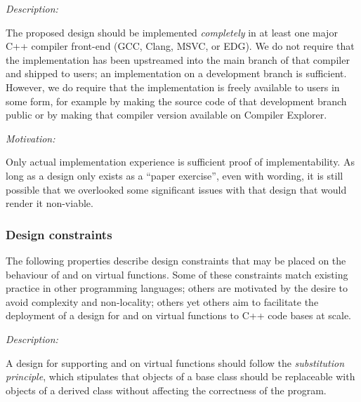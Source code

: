 
\emph{Description:}

The proposed design should be implemented \emph{completely} in at least one major C++ compiler front-end (GCC, Clang, MSVC, or EDG). We do not require that the implementation has been upstreamed into the main branch of that compiler and shipped to users; an implementation on a development branch is sufficient. However, we do require that the implementation is freely available to users in some form, for example by making the source code of that development branch public or by making that compiler version available on Compiler Explorer.

\emph{Motivation:}

Only actual implementation experience is sufficient proof of implementability. As long as a design only exists as a ``paper exercise'', even with wording, it is still possible that we overlooked some significant issues with that design that would render it non-viable.


\subsubsection{Design constraints}

The following properties describe design constraints that may be placed on the behaviour of  and  on virtual functions. Some of these constraints match existing practice in other programming languages; others are motivated by the desire to avoid complexity and non-locality; others yet others aim to facilitate the deployment of a design for  and  on virtual functions to C++ code bases at scale.


\emph{Description:}

A design for supporting  and  on virtual functions should follow the \emph{substitution principle}, which stipulates that objects of a base class should be replaceable with objects of a derived class without affecting the correctness of the program. 

